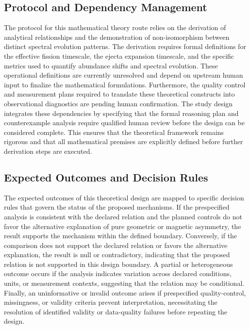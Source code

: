 \documentclass[conference]{IEEEtran}
\begin{document}
\subsection{Protocol and Dependency Management}
The protocol for this mathematical theory route relies on the derivation of analytical relationships and the demonstration of non-isomorphism between distinct spectral evolution patterns. The derivation requires formal definitions for the effective fission timescale, the ejecta expansion timescale, and the specific metrics used to quantify abundance shifts and spectral evolution. These operational definitions are currently unresolved and depend on upstream human input to finalize the mathematical formulations. Furthermore, the quality control and measurement plans required to translate these theoretical constructs into observational diagnostics are pending human confirmation. The study design integrates these dependencies by specifying that the formal reasoning plan and counterexample analysis require qualified human review before the design can be considered complete. This ensures that the theoretical framework remains rigorous and that all mathematical premises are explicitly defined before further derivation steps are executed.

\subsection{Expected Outcomes and Decision Rules}
The expected outcomes of this theoretical design are mapped to specific decision rules that govern the status of the proposed mechanisms. If the prespecified analysis is consistent with the declared relation and the planned controls do not favor the alternative explanation of pure geometric or magnetic asymmetry, the result supports the mechanism within the defined boundary. Conversely, if the comparison does not support the declared relation or favors the alternative explanation, the result is null or contradictory, indicating that the proposed relation is not supported in this design boundary. A partial or heterogeneous outcome occurs if the analysis indicates variation across declared conditions, units, or measurement contexts, suggesting that the relation may be conditional. Finally, an uninformative or invalid outcome arises if prespecified quality-control, missingness, or validity criteria prevent interpretation, necessitating the resolution of identified validity or data-quality failures before repeating the design.
\end{document}

